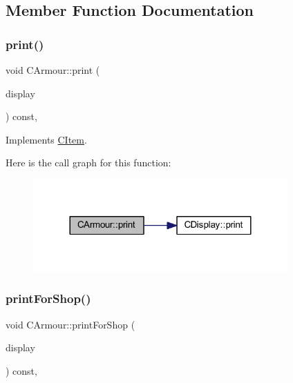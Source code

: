 \subsection{Member Function Documentation}
\mbox{\label{class_c_armour_a169305bd938dfcf38365883b65312068}} 
\subsubsection{\texorpdfstring{print()}{print()}}
{\footnotesize\ttfamily void C\+Armour\+::print (\begin{DoxyParamCaption}\item[{const \mbox{\hyperlink{class_c_display}{C\+Display}} \&}]{display }\end{DoxyParamCaption}) const\hspace{0.3cm}{\ttfamily [override]}, {\ttfamily [virtual]}}



Implements \mbox{\hyperlink{class_c_item_af35b9c64f05a8377298505b3a81bcd18}{C\+Item}}.

Here is the call graph for this function\+:\nopagebreak
\begin{figure}[H]
\begin{center}
\leavevmode
\includegraphics[width=276pt]{class_c_armour_a169305bd938dfcf38365883b65312068_cgraph}
\end{center}
\end{figure}
\mbox{\label{class_c_armour_a3abc5a20200d572d920737aec75bb196}} 
\subsubsection{\texorpdfstring{print\+For\+Shop()}{printForShop()}}
{\footnotesize\ttfamily void C\+Armour\+::print\+For\+Shop (\begin{DoxyParamCaption}\item[{const \mbox{\hyperlink{class_c_display}{C\+Display}} \&}]{display }\end{DoxyParamCaption}) const\hspace{0.3cm}{\ttfamily [override]}, {\ttfamily [virtual]}}



